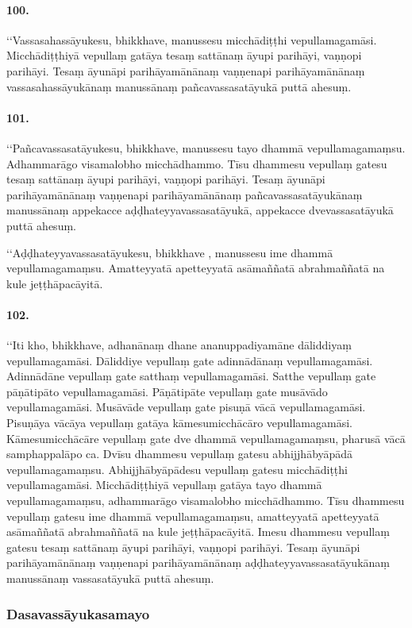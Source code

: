 \paragraph{100.} ‘‘Vassasahassāyukesu, bhikkhave, manussesu micchādiṭṭhi vepullamagamāsi. Micchādiṭṭhiyā vepullaṃ gatāya tesaṃ sattānaṃ āyupi parihāyi, vaṇṇopi parihāyi. Tesaṃ āyunāpi parihāyamānānaṃ vaṇṇenapi parihāyamānānaṃ vassasahassāyukānaṃ manussānaṃ pañcavassasatāyukā puttā ahesuṃ.

\paragraph{101.} ‘‘Pañcavassasatāyukesu, bhikkhave, manussesu tayo dhammā vepullamagamaṃsu. Adhammarāgo visamalobho micchādhammo. Tīsu dhammesu vepullaṃ gatesu tesaṃ sattānaṃ āyupi parihāyi, vaṇṇopi parihāyi. Tesaṃ āyunāpi parihāyamānānaṃ vaṇṇenapi parihāyamānānaṃ pañcavassasatāyukānaṃ manussānaṃ appekacce aḍḍhateyyavassasatāyukā, appekacce dvevassasatāyukā puttā ahesuṃ.

‘‘Aḍḍhateyyavassasatāyukesu, bhikkhave , manussesu ime dhammā vepullamagamaṃsu. Amatteyyatā apetteyyatā asāmaññatā abrahmaññatā na kule jeṭṭhāpacāyitā.

\paragraph{102.} ‘‘Iti kho, bhikkhave, adhanānaṃ dhane ananuppadiyamāne dāliddiyaṃ vepullamagamāsi. Dāliddiye vepullaṃ gate adinnādānaṃ vepullamagamāsi. Adinnādāne vepullaṃ gate satthaṃ vepullamagamāsi. Satthe vepullaṃ gate pāṇātipāto vepullamagamāsi. Pāṇātipāte vepullaṃ gate musāvādo vepullamagamāsi. Musāvāde vepullaṃ gate pisuṇā vācā vepullamagamāsi. Pisuṇāya vācāya vepullaṃ gatāya kāmesumicchācāro vepullamagamāsi. Kāmesumicchācāre vepullaṃ gate dve dhammā vepullamagamaṃsu, pharusā vācā samphappalāpo ca. Dvīsu dhammesu vepullaṃ gatesu abhijjhābyāpādā vepullamagamaṃsu. Abhijjhābyāpādesu vepullaṃ gatesu micchādiṭṭhi vepullamagamāsi. Micchādiṭṭhiyā vepullaṃ gatāya tayo dhammā vepullamagamaṃsu, adhammarāgo visamalobho micchādhammo. Tīsu dhammesu vepullaṃ gatesu ime dhammā vepullamagamaṃsu, amatteyyatā apetteyyatā asāmaññatā abrahmaññatā na kule jeṭṭhāpacāyitā. Imesu dhammesu vepullaṃ gatesu tesaṃ sattānaṃ āyupi parihāyi, vaṇṇopi parihāyi. Tesaṃ āyunāpi parihāyamānānaṃ vaṇṇenapi parihāyamānānaṃ aḍḍhateyyavassasatāyukānaṃ manussānaṃ vassasatāyukā puttā ahesuṃ.

\subsubsection{Dasavassāyukasamayo}

